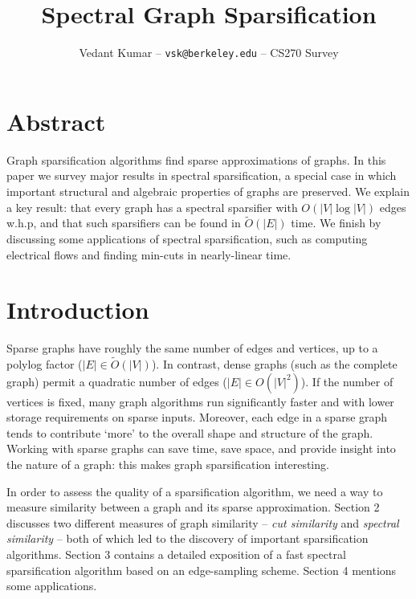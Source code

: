 \documentclass{article}
\title{Spectral Graph Sparsification}
\author{\small{Vedant Kumar -- \texttt{vsk@berkeley.edu} -- CS270 Survey}}
\begin{document}
\maketitle

\newcommand \R{\mathbb{R}}
\newcommand \one{\mathbf{1}}
\newcommand \zero{\mathbf{0}}
\newcommand \Tr{\text{Tr}}
\newcommand \im{\text{im}}
\newcommand \Span{\text{span}}
\newcommand \cut[1]{\text{cut}_{#1}}
\newcommand \textlcsc[1]{\textsc{\MakeLowercase{#1}}}

\section*{Abstract}

Graph sparsification algorithms find sparse approximations of graphs. In
this paper we survey major results in spectral sparsification, a special
case in which important structural and algebraic properties of graphs are
preserved. We explain a key result: that every graph has a spectral
sparsifier with $O(|V|\log|V|)$ edges w.h.p, and that such sparsifiers can
be found in $\tilde{O}(|E|)$ time. We finish by discussing some applications
of spectral sparsification, such as computing electrical flows and finding
min-cuts in nearly-linear time.

\section{Introduction}

Sparse graphs have roughly the same number of edges and vertices, up to a
polylog factor ($|E| \in \tilde{O}(|V|)$). In contrast, dense graphs (such
as the complete graph) permit a quadratic number of edges ($|E| \in
O(|V|^2)$). If the number of vertices is fixed, many graph algorithms run
significantly faster and with lower storage requirements on sparse inputs.
Moreover, each edge in a sparse graph tends to contribute `more' to the
overall shape and structure of the graph.  Working with sparse graphs can
save time, save space, and provide insight into the nature of a graph: this
makes graph sparsification interesting.

In order to assess the quality of a sparsification algorithm, we need a way
to measure similarity between a graph and its sparse approximation. Section
2 discusses two different measures of graph similarity -- \textit{cut
similarity} and \textit{spectral similarity} -- both of which led to the
discovery of important sparsification algorithms. Section 3 contains a
detailed exposition of a fast spectral sparsification algorithm based on an
edge-sampling scheme. Section 4 mentions some applications.
\end{document}
